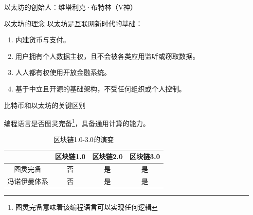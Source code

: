 \documentclass[11pt]{beamer}
\begin{document}
\begin{frame}{以太坊的创始人：维塔利克·布特林（V神）}
\begin{minipage}[t]{0.3\linewidth}
\begin{figure}
{\begin{minipage}[b]{0.8\linewidth}
				\end{minipage}%
			}
		\end{figure}
	\end{minipage}%
\end{frame}

\begin{frame}{以太坊的理念}
	以太坊是互联网新时代的基础：
	\begin{enumerate}
		\item 内建货币与支付。
		\item 用户拥有个人数据主权，且不会被各类应用监听或窃取数据。
		\item 人人都有权使用开放金融系统。
		\item 基于中立且开源的基础架构，不受任何组织或个人控制。
	\end{enumerate}
\end{frame}

\begin{frame}{比特币和以太坊的关键区别}
	
	编程语言是否图灵完备\footnote{图灵完备意味着该编程语言可以实现任何逻辑}，具备通用计算的能力。
	
	\begin{table}[htb]
		\label{table:blockchainGeneration}
		\centering
		\begin{tabular}{c|ccc}
			\hline
			& 区块链1.0& 区块链2.0 & 区块链3.0  \\
			\hline
			图灵完备& 否& 是 & 是\\
			冯诺伊曼体系 & 否 & 是 & 是\\
			\hline
		\end{tabular}
		\caption{区块链1.0-3.0的演变}
	\end{table}
\end{frame}
\end{document}
